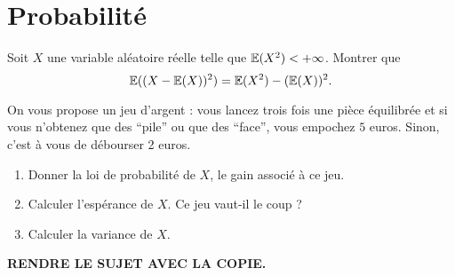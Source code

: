 \documentclass{article}
\begin{document}
\section{Probabilité}

\exo{}Soit $X$ une variable aléatoire réelle telle que $\mathbb{E}(X^2) < +\infty$. Montrer que 
\[
	\mathbb{E}( (X-\mathbb{E}(X))^2) = \mathbb{E}(X^2) - (\mathbb{E}(X))^2.
\]

\bigskip

\exo{} On vous propose un jeu d'argent : vous lancez trois fois une pièce équilibrée et si vous n'obtenez que des ``pile'' ou que des ``face'', vous empochez $5$ euros. Sinon, c'est à vous de débourser 2 euros.
\begin{enumerate}
	\item  Donner la loi de probabilité de $X$, le gain associé à ce jeu.
	\item  Calculer l'espérance de $X$. Ce jeu vaut-il le coup ?
	\item  Calculer la variance de $X$.
\end{enumerate}

\begin{center}
{\large \sffamily\bfseries RENDRE LE SUJET AVEC LA COPIE. }
\end{center}
\end{document}

